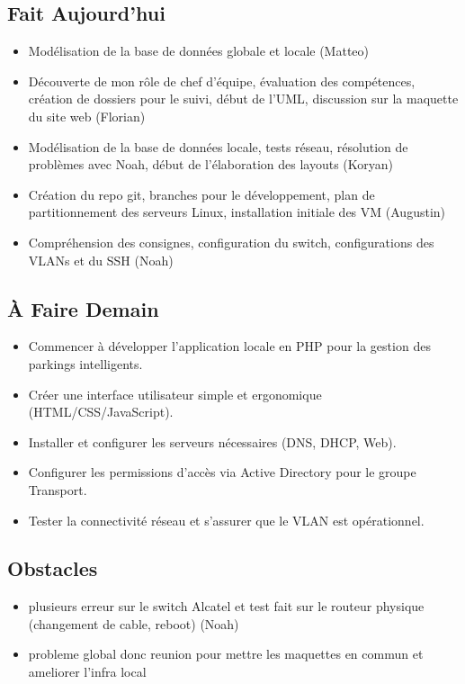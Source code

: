 \documentclass[a4paper,12pt]{report}
\begin{document}
\subsection{Fait Aujourd'hui}
\begin{itemize}
    \item Modélisation de la base de données globale et locale (Matteo)
    \item Découverte de mon rôle de chef d’équipe, évaluation des compétences, création de dossiers pour le suivi, début de l’UML, discussion sur la maquette du site web (Florian)
    \item Modélisation de la base de données locale, tests réseau, résolution de problèmes avec Noah, début de l’élaboration des layouts (Koryan)
    \item Création du repo git, branches pour le développement, plan de partitionnement des serveurs Linux, installation initiale des VM (Augustin)
    \item Compréhension des consignes, configuration du switch, configurations des VLANs et du SSH (Noah)
\end{itemize}

\subsection{À Faire Demain}
\begin{itemize}
    \item Commencer à développer l'application locale en PHP pour la gestion des parkings intelligents.
    \item Créer une interface utilisateur simple et ergonomique (HTML/CSS/JavaScript).
    \item Installer et configurer les serveurs nécessaires (DNS, DHCP, Web).
    \item Configurer les permissions d'accès via Active Directory pour le groupe Transport.
    \item Tester la connectivité réseau et s'assurer que le VLAN est opérationnel.
\end{itemize}

\subsection{Obstacles}

\begin{itemize}
    \item plusieurs erreur sur le switch Alcatel et test fait sur le routeur physique (changement de cable, reboot) (Noah)
    \item probleme global donc reunion pour mettre les maquettes en commun et ameliorer l'infra local
\end{itemize}
\end{document}
